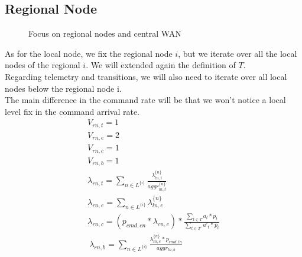 \documentclass[11pt]{article}
\begin{document}
\subsection{Regional Node}
\begin{figure}[H]
	\centering
	\hspace*{-3.7cm}
	\frame{}
	\caption{Focus on regional nodes and central WAN}
\end{figure}
As for the local node, we fix the regional node $i$, but we iterate over all the local nodes of the regional $i$. We will extended again the definition of $T$.\\
Regarding telemetry and transitions, we will also need to iterate over all local nodes below the regional node i.\\
The main difference in the command rate will be that we won't notice a local level fix in the command arrival rate.
\begin{equation}
	\begin{array}{l}
		V_{rn, t} = 1 \\
		V_{rn, e} = 2 \\ %
		V_{rn, c} = 1 \\
		V_{rn, b} = 1 \\
        \lambda_{rn, t} = \sum\limits_{n \in L^{\{i\}}}{\frac{\lambda^{\{n\}}_{ln, t}}{aggr^{\{n\}}_{ln, t}}}  \\
        \lambda_{rn, e} = \sum\limits_{n \in L^{\{i\}}}{\lambda^{\{n\}}_{ln, e}} \\
		\lambda_{rn,c}= (p_{cmd,cn} * \lambda_{cn, e})* \frac{\sum\limits_{t \in T}{a_{t} * p_{t}}}{\sum\limits_{t \in T'}{a'_{t} * p_{t}}} \\\
		\lambda_{rn,b}=\sum\limits_{n \in L^{\{i\}}}\frac{\lambda_{ln,e}^{\{n\}}*p_{cmd,ln}}{aggr_{ln,b}}\\

	\end{array}
\end{equation}
\end{document}
